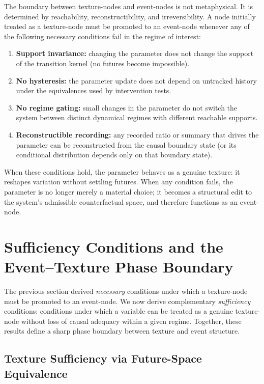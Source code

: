 \documentclass[11pt]{article}
\begin{document}
The boundary between texture-nodes and event-nodes is not metaphysical. It is
determined by reachability, reconstructibility, and irreversibility. A node
initially treated as a texture-node must be promoted to an event-node whenever
any of the following necessary conditions fail in the regime of interest:

\begin{enumerate}
\item \textbf{Support invariance:} changing the parameter does not change the
support of the transition kernel (no futures become impossible).
\item \textbf{No hysteresis:} the parameter update does not depend on untracked
history under the equivalences used by intervention tests.
\item \textbf{No regime gating:} small changes in the parameter do not switch
the system between distinct dynamical regimes with different reachable supports.
\item \textbf{Reconstructible recording:} any recorded ratio or summary that
drives the parameter can be reconstructed from the causal boundary state (or
its conditional distribution depends only on that boundary state).
\end{enumerate}

When these conditions hold, the parameter behaves as a genuine texture: it
reshapes variation without settling futures. When any condition fails, the
parameter is no longer merely a material choice; it becomes a structural edit
to the system's admissible counterfactual space, and therefore functions as an
event-node.

\section{Sufficiency Conditions and the Event--Texture Phase Boundary}

The previous section derived \emph{necessary} conditions under which a
texture-node must be promoted to an event-node. We now derive complementary
\emph{sufficiency} conditions: conditions under which a variable can be treated
as a genuine texture-node without loss of causal adequacy within a given
regime. Together, these results define a sharp phase boundary between texture
and event structure.

\subsection{Texture Sufficiency via Future-Space Equivalence}
\end{document}
